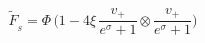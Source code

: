 \begin{equation}\label{boro20old}
\tilde{F}_{_{\!S}}=\Phi\,\Big(1-4\xi\,\frac {v_{+}^{}}{e^{\sigma}+1}\otimes
\frac{v_{+}^{}}{e^{\sigma}+1}\Big)
\end{equation}

